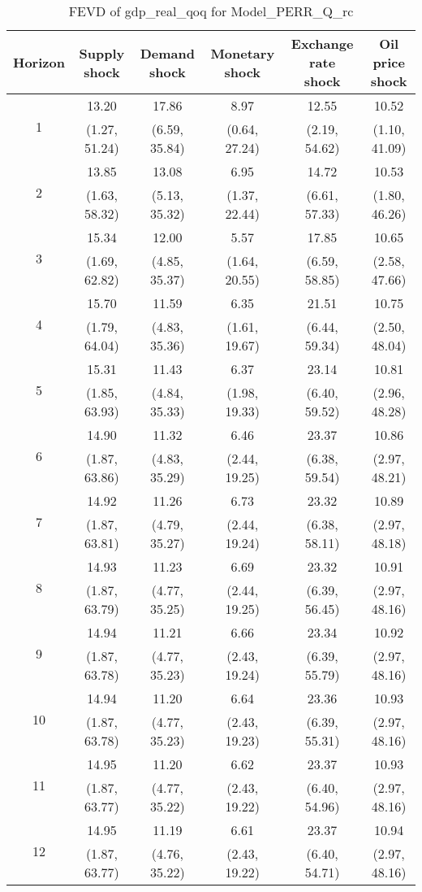 \documentclass{article}
\begin{document}
\begin{table}
	\footnotesize
	\caption{FEVD of gdp_real_qoq for Model_PERR_Q_rc}
	\begin{tabular}{cccccc}
		Horizon & Supply shock & Demand shock & Monetary shock & Exchange rate shock & Oil price shock\\ \hline
		\multirow{2}{*}{1} & 13.20 & 17.86 & 8.97 & 12.55 & 10.52\\
		 & (1.27, 51.24) & (6.59, 35.84) & (0.64, 27.24) & (2.19, 54.62) & (1.10, 41.09)\\
		\multirow{2}{*}{2} & 13.85 & 13.08 & 6.95 & 14.72 & 10.53\\
		 & (1.63, 58.32) & (5.13, 35.32) & (1.37, 22.44) & (6.61, 57.33) & (1.80, 46.26)\\
		\multirow{2}{*}{3} & 15.34 & 12.00 & 5.57 & 17.85 & 10.65\\
		 & (1.69, 62.82) & (4.85, 35.37) & (1.64, 20.55) & (6.59, 58.85) & (2.58, 47.66)\\
		\multirow{2}{*}{4} & 15.70 & 11.59 & 6.35 & 21.51 & 10.75\\
		 & (1.79, 64.04) & (4.83, 35.36) & (1.61, 19.67) & (6.44, 59.34) & (2.50, 48.04)\\
		\multirow{2}{*}{5} & 15.31 & 11.43 & 6.37 & 23.14 & 10.81\\
		 & (1.85, 63.93) & (4.84, 35.33) & (1.98, 19.33) & (6.40, 59.52) & (2.96, 48.28)\\
		\multirow{2}{*}{6} & 14.90 & 11.32 & 6.46 & 23.37 & 10.86\\
		 & (1.87, 63.86) & (4.83, 35.29) & (2.44, 19.25) & (6.38, 59.54) & (2.97, 48.21)\\
		\multirow{2}{*}{7} & 14.92 & 11.26 & 6.73 & 23.32 & 10.89\\
		 & (1.87, 63.81) & (4.79, 35.27) & (2.44, 19.24) & (6.38, 58.11) & (2.97, 48.18)\\
		\multirow{2}{*}{8} & 14.93 & 11.23 & 6.69 & 23.32 & 10.91\\
		 & (1.87, 63.79) & (4.77, 35.25) & (2.44, 19.25) & (6.39, 56.45) & (2.97, 48.16)\\
		\multirow{2}{*}{9} & 14.94 & 11.21 & 6.66 & 23.34 & 10.92\\
		 & (1.87, 63.78) & (4.77, 35.23) & (2.43, 19.24) & (6.39, 55.79) & (2.97, 48.16)\\
		\multirow{2}{*}{10} & 14.94 & 11.20 & 6.64 & 23.36 & 10.93\\
		 & (1.87, 63.78) & (4.77, 35.23) & (2.43, 19.23) & (6.39, 55.31) & (2.97, 48.16)\\
		\multirow{2}{*}{11} & 14.95 & 11.20 & 6.62 & 23.37 & 10.93\\
		 & (1.87, 63.77) & (4.77, 35.22) & (2.43, 19.22) & (6.40, 54.96) & (2.97, 48.16)\\
		\multirow{2}{*}{12} & 14.95 & 11.19 & 6.61 & 23.37 & 10.94\\
		 & (1.87, 63.77) & (4.76, 35.22) & (2.43, 19.22) & (6.40, 54.71) & (2.97, 48.16)\\
	\end{tabular}
\label{tab:fevd-Model_PERR_Q_rc-gdp_real_qoq}
\end{table}
\end{document}
